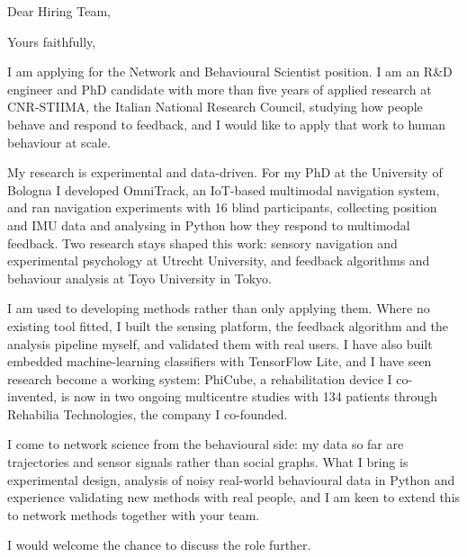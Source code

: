 \documentclass[11pt,a4paper,sans]{moderncv}
\begin{document}

\opening{Dear Hiring Team,}
\closing{Yours faithfully,}
\makelettertitle

I am applying for the Network and Behavioural Scientist position. I am an R\&D engineer and PhD candidate with more than five years of applied research at CNR-STIIMA, the Italian National Research Council, studying how people behave and respond to feedback, and I would like to apply that work to human behaviour at scale.

My research is experimental and data-driven. For my PhD at the University of Bologna I developed OmniTrack, an IoT-based multimodal navigation system, and ran navigation experiments with 16 blind participants, collecting position and IMU data and analysing in Python how they respond to multimodal feedback. Two research stays shaped this work: sensory navigation and experimental psychology at Utrecht University, and feedback algorithms and behaviour analysis at Toyo University in Tokyo.

I am used to developing methods rather than only applying them. Where no existing tool fitted, I built the sensing platform, the feedback algorithm and the analysis pipeline myself, and validated them with real users. I have also built embedded machine-learning classifiers with TensorFlow Lite, and I have seen research become a working system: PhiCube, a rehabilitation device I co-invented, is now in two ongoing multicentre studies with 134 patients through Rehabilia Technologies, the company I co-founded.

I come to network science from the behavioural side: my data so far are trajectories and sensor signals rather than social graphs. What I bring is experimental design, analysis of noisy real-world behavioural data in Python and experience validating new methods with real people, and I am keen to extend this to network methods together with your team.

I would welcome the chance to discuss the role further.

\makeletterclosing
\end{document}
